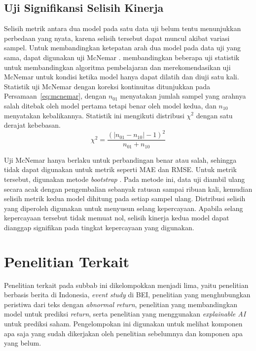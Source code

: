 \subsection{Uji Signifikansi Selisih Kinerja}

Selisih metrik antara dua model pada satu data uji belum tentu menunjukkan perbedaan yang nyata, karena selisih tersebut dapat muncul akibat variasi sampel. Untuk membandingkan ketepatan arah dua model pada data uji yang sama, dapat digunakan uji McNemar \autocite{mcnemar1947}. \textcite{dietterich1998} membandingkan beberapa uji statistik untuk membandingkan algoritma pembelajaran dan merekomendasikan uji McNemar untuk kondisi ketika model hanya dapat dilatih dan diuji satu kali. Statistik uji McNemar dengan koreksi kontinuitas ditunjukkan pada Persamaan~\ref{eq:mcnemar}, dengan $n_{01}$ menyatakan jumlah sampel yang arahnya salah ditebak oleh model pertama tetapi benar oleh model kedua, dan $n_{10}$ menyatakan kebalikannya. Statistik ini mengikuti distribusi $\chi^2$ dengan satu derajat kebebasan.
\begin{equation}
\chi^2 = \frac{\left( \left| n_{01} - n_{10} \right| - 1 \right)^2}{n_{01} + n_{10}}
\label{eq:mcnemar}
\end{equation}

Uji McNemar hanya berlaku untuk perbandingan benar atau salah, sehingga tidak dapat digunakan untuk metrik seperti MAE dan RMSE. Untuk metrik tersebut, digunakan metode \emph{bootstrap} \autocite{efron1979}. Pada metode ini, data uji diambil ulang secara acak dengan pengembalian sebanyak ratusan sampai ribuan kali, kemudian selisih metrik kedua model dihitung pada setiap sampel ulang. Distribusi selisih yang diperoleh digunakan untuk menyusun selang kepercayaan. Apabila selang kepercayaan tersebut tidak memuat nol, selisih kinerja kedua model dapat dianggap signifikan pada tingkat kepercayaan yang digunakan.

\section{Penelitian Terkait}
\label{sec:penelitian-terkait}

Penelitian terkait pada subbab ini dikelompokkan menjadi lima, yaitu penelitian berbasis berita di Indonesia, \emph{event study} di BEI, penelitian yang menghubungkan peristiwa dari teks dengan \emph{abnormal return}, penelitian yang membandingkan model untuk prediksi \emph{return}, serta penelitian yang menggunakan \emph{explainable AI} untuk prediksi saham. Pengelompokan ini digunakan untuk melihat komponen apa saja yang sudah dikerjakan oleh penelitian sebelumnya dan komponen apa yang belum.

